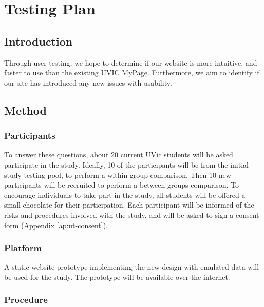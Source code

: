 \documentclass{article}
\begin{document}

\section{Testing Plan}

\subsection{Introduction}

Through user testing, we hope to determine if our website is more intuitive, and faster to use than the existing UVIC MyPage. Furthermore, we aim to identify if our site has introduced any new issues with usability.

\subsection{Method}

\subsubsection{Participants}

To answer these questions, about 20 current UVic students will be asked participate in the study. Ideally, 10 of the participants will be from the initial-study testing pool, to perform a within-group comparison. Then 10 new participants will be recruited to perform a between-groups comparison. To encourage individuals to take part in the study, all students will be offered a small chocolate for their participation. Each participant will be informed of the risks and procedures involved with the study, and will be asked to sign a consent form (Appendix \ref{ap:ut-consent}).

\subsubsection{Platform}

A static website prototype implementing the new design with emulated data will be used for the study. The prototype will be available over the internet.

\subsubsection{Procedure}
\end{document}
